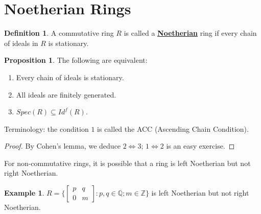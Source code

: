 \documentclass{article}
\theoremstyle{definition}
\theoremstyle{definition}
\theoremstyle{definition}
\newtheorem{proposition}{Proposition}[section]
\theoremstyle{definition}
\theoremstyle{definition}
\newtheorem{definition}{Definition}[section]
\theoremstyle{definition}
\theoremstyle{definition}
\newtheorem{example}{Example}[section]
\begin{document}
\section{Noetherian Rings}



\begin{tcolorbox}[colback=purple!5!white,colframe=purple!75!black]
\begin{definition}
A commutative ring $R$ is called a \underline{\textbf{Noetherian}} ring if every chain of ideals in $R$ is stationary.
\end{definition}
\end{tcolorbox}




\begin{tcolorbox}[colback=blue!5!white,colframe=blue!30!white]
\begin{proposition} The following are equivalent:
    \begin{enumerate}
        \item Every chain of ideals is stationary.
        \item All ideals are finitely generated.
        \item $Spec(R)\subseteq Id^f(R)$.    
    \end{enumerate}
    Terminology: the condition $1$ is called the ACC (Ascending Chain Condition).
\end{proposition}
\end{tcolorbox}
\begin{proof}
    By Cohen's lemma, we deduce $2\iff 3$; $1\iff 2$ is an easy exercise.
\end{proof}


For non-commutative rings, it is possible that a ring is left Noetherian but not right Noetherian.
 
 \begin{tcolorbox}[colback=yellow!5!white,colframe=yellow!30!white]
 \begin{example}
 $R=\{
 \begin{bmatrix}
 p&q\\
 0&m
 \end{bmatrix}: p,q\in \mathbb{Q}; m\in \mathbb{Z} \}$ is left Noetherian but not right Noetherian. 
 \end{example}
 \end{tcolorbox}
\end{document}
